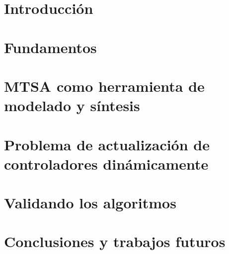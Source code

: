 \chapter{Introducción}





\chapter{Fundamentos}








\chapter{MTSA como herramienta de modelado y síntesis}

\chapter{Problema de actualización de controladores dinámicamente}

\chapter{Validando los algoritmos}




\chapter{Conclusiones y trabajos futuros}





